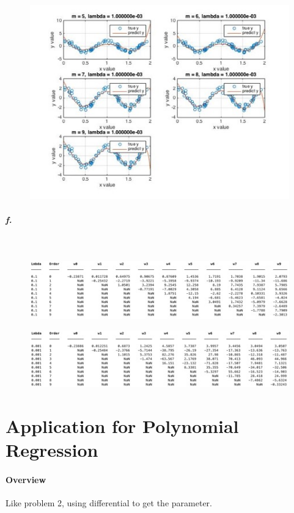\documentclass[]{article}
\begin{document}
	\begin{figure}[H]
		\centering
		\includegraphics[width=0.8\linewidth]{2ge4}
		\caption{}
		\label{fig:2ge4}
	\end{figure}

	\subparagraph{f.}\mbox{}\\
	
	\begin{figure}[H]
		\centering
		\includegraphics[width=1.2\linewidth]{2gf1}
		\caption{}
		\label{fig:2gf1}
	\end{figure}
	\begin{figure}[H]
		\centering
		\includegraphics[width=1.2\linewidth]{2gf2}
		\caption{}
		\label{fig:2gf2}
	\end{figure}	
	
	\section{Application for Polynomial Regression}
	\paragraph{Overview}
	Like problem 2, using differential to get the parameter.
\end{document}
